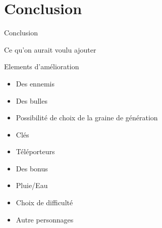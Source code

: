 \documentclass{beamer}
\begin{document}
{\section{Conclusion}
\begin{frame}{Conclusion}

\end{frame}

\begin{frame}{Ce qu'on aurait voulu ajouter}
    \begin{block}{Elements d'amélioration}
        \begin{itemize}
          \item[\bullet] Des ennemis
          \item[\bullet] Des bulles
          \item[\bullet] Possibilité de choix de la graine de génération
          \item[\bullet] Clés
          \item[\bullet] Téléporteurs
          \item[\bullet] Des bonus
          \item[\bullet] Pluie/Eau
          \item[\bullet] Choix de difficulté
          \item[\bullet] Autre personnages
        \end{itemize}
    \end{block}
\end{frame}

}
\end{document}
